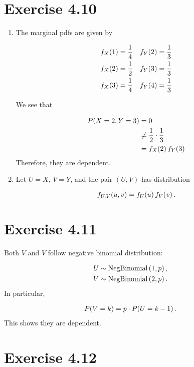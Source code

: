 \documentclass[12pt,letterpaper,reqno]{amsart}
\numberwithin{equation}{subsection}
\begin{document}
\newpage
\section{Exercise 4.10}

\begin{enumerate}[label=(\alph*),leftmargin=*]
    \item The marginal pdfs are given by
    
    \begin{align*}
        {f_X}\! \left( {1} \right) &= \frac{1}{4} & {f_Y}\! \left( {2} \right) &= \frac{1}{3} \\
        {f_X}\! \left( {2} \right) &= \frac{1}{2} & {f_Y}\! \left( {3} \right) &= \frac{1}{3} \\
        {f_X}\! \left( {3} \right) &= \frac{1}{4} & {f_Y}\! \left( {4} \right) &= \frac{1}{3}
    \end{align*}
    
    We see that
    
    \begin{align*}
        {P}\! \left( {X = 2, Y = 3} \right) &= 0 \\
                              &\not= \frac{1}{2} \cdot \frac{1}{3} \\
                              &= {f_X}\! \left( {2} \right) {f_Y}\! \left( {3} \right)
    \end{align*}
    Therefore, they are dependent.
    
    \item Let $U = X$, $V = Y$, and the pair $(U,V)$ has distribution
    
    \[ {f_{U,V}}\! \left( {u,v} \right) = {f_U}\! \left( {u} \right) {f_V}\! \left( {v} \right). \]
\end{enumerate}

\newpage
\section{Exercise 4.11}

Both $V$ and $V$ follow negative binomial distribution:

\begin{align*}
    U &\sim \operatorname{NegBinomial}\left( {1, p} \right), \\
    V &\sim \operatorname{NegBinomial}\left( {2, p} \right).
\end{align*}
In particular,

\begin{align*}
    {P}\! \left( {V = k} \right) = p \cdot {P}\! \left( {U = k-1} \right).
\end{align*}
This shows they are dependent.

\newpage
\section{Exercise 4.12}
\end{document}
